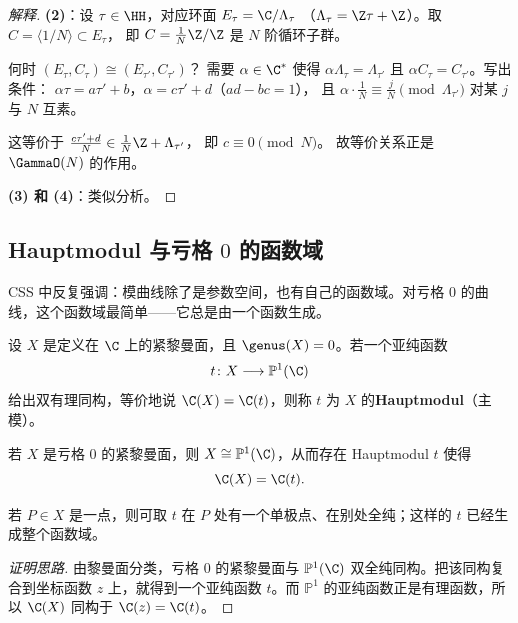 \begin{proof}[解释]
\textbf{(2)}：设 $\tau \in \HH$，对应环面 $E_\tau = \C/\Lambda_\tau$
（$\Lambda_\tau = \Z\tau + \Z$）。取 $C = \langle 1/N \rangle \subset E_\tau$，
即 $C = \frac{1}{N}\Z/\Z$ 是 $N$ 阶循环子群。

何时 $(E_\tau, C_\tau) \cong (E_{\tau'}, C_{\tau'})$？
需要 $\alpha \in \C^*$ 使得 $\alpha\Lambda_\tau = \Lambda_{\tau'}$
且 $\alpha C_\tau = C_{\tau'}$。写出条件：
$\alpha\tau = a\tau' + b$，$\alpha = c\tau' + d$（$ad - bc = 1$），
且 $\alpha \cdot \frac{1}{N} \equiv \frac{j}{N} \pmod{\Lambda_{\tau'}}$
对某 $j$ 与 $N$ 互素。

这等价于 $\frac{c\tau' + d}{N} \in \frac{1}{N}\Z + \Lambda_{\tau'}$，
即 $c \equiv 0 \pmod{N}$。
故等价关系正是 $\GammaO(N)$ 的作用。

\textbf{(3) 和 (4)}：类似分析。
\end{proof}

\subsection*{Hauptmodul 与亏格 $0$ 的函数域}

CSS 中反复强调：模曲线除了是参数空间，也有自己的函数域。对亏格 $0$ 的曲线，这个函数域最简单——它总是由一个函数生成。

\begin{definition}[Hauptmodul]
\label{def:hauptmodul}
设 $X$ 是定义在 $\C$ 上的紧黎曼面，且 $\genus(X)=0$。若一个亚纯函数
\[
  t\colon X \longrightarrow \mathbb{P}^1(\C)
\]
给出双有理同构，等价地说 $\C(X)=\C(t)$，则称 $t$ 为 $X$ 的\textbf{Hauptmodul}（主模）。
\end{definition}

\begin{proposition}[亏格 $0$ 曲线的函数域]
\label{prop:genus0-hauptmodul}
若 $X$ 是亏格 $0$ 的紧黎曼面，则 $X\cong \mathbb{P}^1(\C)$，从而存在 Hauptmodul $t$ 使得
\[
  \C(X)=\C(t).
\]

若 $P\in X$ 是一点，则可取 $t$ 在 $P$ 处有一个单极点、在别处全纯；这样的 $t$ 已经生成整个函数域。
\end{proposition}

\begin{proof}[证明思路]
由黎曼面分类，亏格 $0$ 的紧黎曼面与 $\mathbb{P}^1(\C)$ 双全纯同构。把该同构复合到坐标函数 $z$ 上，就得到一个亚纯函数 $t$。而 $\mathbb{P}^1$ 的亚纯函数正是有理函数，所以 $\C(X)$ 同构于 $\C(z)=\C(t)$。
\end{proof}


